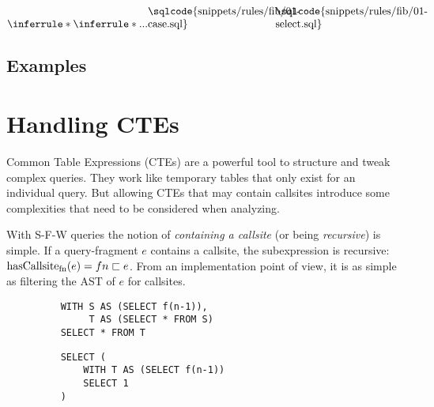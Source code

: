 

$
\inferrule*{
    \inferrule*{...}{
{\begin{minipage}[b]{12em}
\sqlcode{snippets/rules/fib/01-case.sql}
\end{minipage}}
    }
}{
{\begin{minipage}[b]{12em}
\sqlcode{snippets/rules/fib/01-select.sql}
\end{minipage}}
}
$

\fi

\subsection{Examples}


\section{Handling CTEs}

Common Table Expressions (CTEs) are a powerful tool to structure and tweak complex queries. They work like temporary tables that only exist for an individual query. But allowing CTEs that may contain callsites introduce some complexities that need to be considered when analyzing.

With S-F-W queries the notion of \textit{containing a callsite} (or being \textit{recursive}) is simple. If a query-fragment $e$ contains a callsite, the subexpression is recursive: $\operatorname{\text{hasCallsite}_{fn}}(e) = fn \sqsubset e$. From an implementation point of view, it is as simple as filtering the AST of $e$ for callsites.

\begin{wrapfigure}{r}{.5\textwidth} 
    \begin{minipage}{\linewidth}
    \label{fig:simple_indiref}\par\vfill
    \begin{verbatim}
    WITH S AS (SELECT f(n-1)),
         T AS (SELECT * FROM S)
    SELECT * FROM T
    \end{verbatim}
    \label{fig:indirect_callsite}\par
    \vspace{3mm}
    \begin{verbatim}
    SELECT (
        WITH T AS (SELECT f(n-1))
        SELECT 1
    )
    \end{verbatim}
    \label{fig:unused_callsite}
\end{minipage}
\caption{}
\label{lst:indirect_callsite_ref}\vspace{-5mm} 
\end{wrapfigure}

